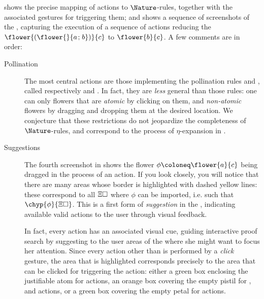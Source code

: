 \begin{scope}
 shows the precise mapping of \Proof actions to
$\Nature$-rules, together with the associated gestures for triggering them; and
 shows a sequence of screenshots of the , capturing the execution of a sequence of \Proof actions reducing the
 $\flower{(\flower{}{a \sep b})}{c}$ to $\flower{b}{c}$. A few
comments are in order:

\begin{description}
  \item[Pollination] The most central actions are those implementing
  the pollination rules  and , called respectively
   and . In fact, they are \emph{less} general
  than those rules: one can only  flowers that are \emph{atomic}
  by clicking on them, and  \emph{non-atomic} flowers by dragging
  and dropping them at the desired location. We conjecture that these
  restrictions do not jeopardize the completeness of $\Nature$-rules, and
  correspond to the process of $\eta$-expansion in .
  
  \item[Suggestions]
  
  The fourth screenshot in  shows the flower $\phi
  \deq \flower{a}{c}$ being dragged in the process of an  action.
  If you look closely, you will notice that there are many areas whose border is
  highlighted with dashed yellow lines: these correspond to all 
  $\Xi\square$ where $\phi$ can be imported, i.e. such that
  $\chyp{\phi}{\Xi\hole}$. This is a first form of \emph{suggestion} in the
  , indicating available valid actions to the user through visual
  feedback.

  In fact, every \Proof action has an associated visual cue, guiding interactive
  proof search by suggesting to the user areas of the  where she might want
  to focus her attention. Since every action other than  is
  performed by a \emph{click} gesture, the area that is highlighted corresponds
  precisely to the area that can be clicked for triggering the action: either a
  green box enclosing the justifiable atom for  actions, an
  orange box covering the empty pistil for ,  and
   actions, or a green box covering the empty petal for
   actions.
  

\end{description}
\end{scope}
